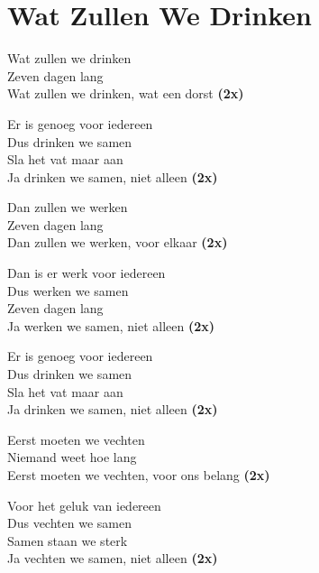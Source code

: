 \section{Wat Zullen We Drinken}
Wat zullen we drinken \\
Zeven dagen lang \\
Wat zullen we drinken, wat een dorst \textbf{(2x)}

Er is genoeg voor iedereen \\
Dus drinken we samen \\
Sla het vat maar aan \\
Ja drinken we samen, niet alleen \textbf{(2x)}

Dan zullen we werken \\
Zeven dagen lang \\
Dan zullen we werken, voor elkaar \textbf{(2x)}

Dan is er werk voor iedereen \\
Dus werken we samen \\
Zeven dagen lang \\
Ja werken we samen, niet alleen \textbf{(2x)}

Er is genoeg voor iedereen \\
Dus drinken we samen \\
Sla het vat maar aan \\
Ja drinken we samen, niet alleen \textbf{(2x)}

Eerst moeten we vechten \\
Niemand weet hoe lang \\
Eerst moeten we vechten, voor ons belang \textbf{(2x)}

Voor het geluk van iedereen \\
Dus vechten we samen \\
Samen staan we sterk \\
Ja vechten we samen, niet alleen \textbf{(2x)}